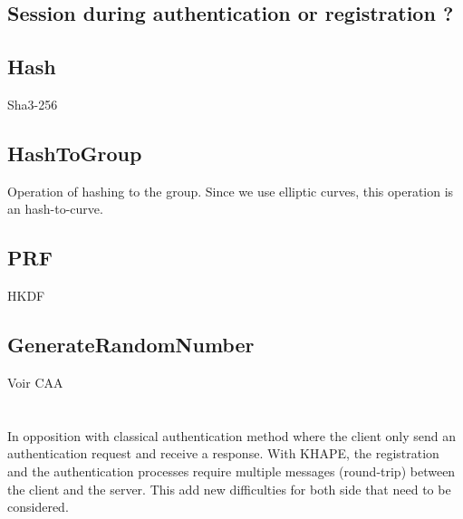 \documentclass[../report.tex]{subfiles}
\begin{document}
% 
% 
% 



\subsection{Session during authentication or registration ?}


\subsection{Hash}
Sha3-256

\subsection{HashToGroup}
Operation of hashing to the group. Since we use elliptic curves, this operation is an hash-to-curve.


\subsection{PRF}
HKDF



\subsection{GenerateRandomNumber}
Voir CAA





\section{}

In opposition with classical authentication method where the client only send an authentication request and receive a response. With KHAPE, the registration and the authentication processes require multiple messages (round-trip) between the client and the server.
This add new difficulties for both side that need to be considered.
\end{document}
